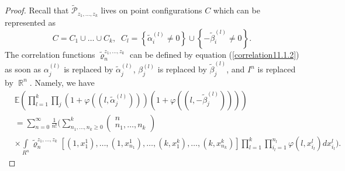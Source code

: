 \documentclass[12pt]{amsart}
\theoremstyle{definition}
\numberwithin{equation}{section}
\DeclareMathOperator{\R}{\mathbb{R}}
\begin{document}
\begin{proof}
Recall that $\widetilde{\mathcal{P}}_{z_1,\ldots,z_k}$ lives on point configurations
$C$ which can be represented as
$$
C=C_1\cup\ldots\cup C_k,\;\; C_l=\left\{\tilde{\alpha}_i^{(l)}\neq 0\right\}\cup\left\{-\tilde{\beta}_i^{(l)}\neq 0\right\}.
$$
The correlation functions $\widetilde{\varrho}_n^{z_1,\ldots,z_k}$ can be defined by equation (\ref{correlation11.1.2}) as soon as $\alpha_j^{(l)}$ is replaced by
$\tilde{\alpha}_j^{(l)}$, $\beta_j^{(l)}$ is replaced by $\tilde{\beta}_j^{(l)}$, and $I^{n}$ is replaced by $\R^n$.  Namely, we have
\begin{equation}\label{correlation11.1.2.new}
\begin{split}
&\mathbb{E}\left(\prod\limits_{l=1}^k\prod\limits_{j}
\left(1+\varphi\left(\left(l,\tilde{\alpha}_j^{(l)}\right)\right)\right)
\left(1+\varphi\left(\left(l,-\tilde{\beta}_j^{(l)}\right)\right)\right)\right)\\
&=\sum\limits_{n=0}^{\infty}\frac{1}{n!}
\biggl(\sum\limits_{n_1,\ldots,n_k\geq 0}^k
\left(\begin{array}{c}
  n\\
  n_1,\ldots,n_k
\end{array}\right)
\\
&
\times\int\limits_{R^n}\widetilde{\varrho}_n^{z_1,\ldots,z_k}\left[
\left(1,x_1^{1}\right),\ldots,\left(1,x_{n_1}^{1}\right),
\ldots,\left(k,x_1^k\right),\ldots, \left(k,x_{n_k}^k\right)\right]
\prod\limits_{l=1}^k\prod\limits_{i_l=1}^{n_l}\varphi\left(l,x_{i_l}^{l}\right)dx_{i_l}^{l}\biggr).
\end{split}
\end{equation}





\end{proof}
\end{document}
